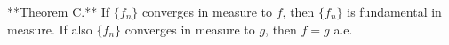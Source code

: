 **Theorem C.** If $\{f_n\}$ converges in measure to $f$, then $\{f_n\}$ is fundamental in measure. If also $\{f_n\}$ converges in measure to $g$, then $f = g$ a.e.
